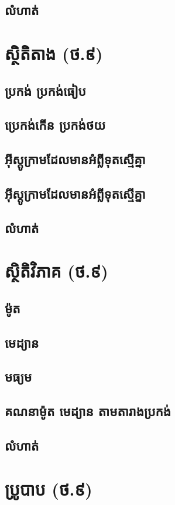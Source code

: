 \documentclass[a4paper,12pt,blue]{pptec}
\begin{document}
	\section{លំហាត់}
	\chapter{ស្ថិតិតាង (ថ.៩)}
	\section{ប្រកង់ ប្រកង់ធៀប}
	\section{ប្រេកង់កើន ប្រកង់ថយ}
	\section{អ៊ីស្តូក្រាមដែលមានអំព្លីទុតស្មើគ្នា}
	\section{អ៊ីស្តូក្រាមដែលមានអំព្លីទុតស្មើគ្នា}
	\section{លំហាត់}
	\chapter{ស្ថិតិវិភាគ (ថ.៩)}
	\section{ម៉ូត}
	\section{មេដ្យាន}
	\section{មធ្យម}
	\section{គណនាម៉ូត មេដ្យាន តាមតារាងប្រកង់}
	\section{លំហាត់}
	\chapter{ប្រូបាប (ថ.៩)}
\end{document}
